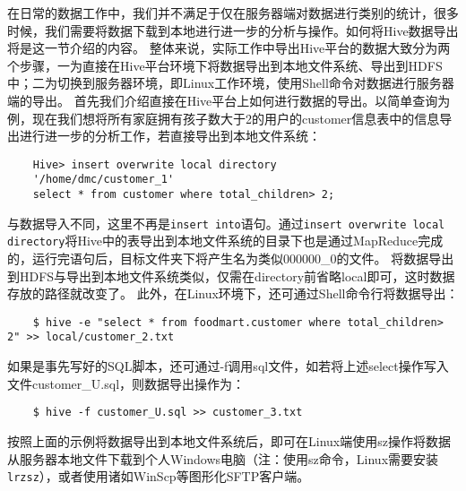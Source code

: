 在日常的数据工作中，我们并不满足于仅在服务器端对数据进行类别的统计，很多时候，我们需要将数据下载到本地进行进一步的分析与操作。如何将Hive数据导出将是这一节介绍的内容。
整体来说，实际工作中导出Hive平台的数据大致分为两个步骤，一为直接在Hive平台环境下将数据导出到本地文件系统、导出到HDFS中；二为切换到服务器环境，即Linux工作环境，使用Shell命令对数据进行服务器端的导出。
首先我们介绍直接在Hive平台上如何进行数据的导出。以简单查询为例，现在我们想将所有家庭拥有孩子数大于2的用户的customer信息表中的信息导出进行进一步的分析工作，若直接导出到本地文件系统：

\begin{lstlisting}
	Hive> insert overwrite local directory
	'/home/dmc/customer_1'
	select * from customer where total_children> 2;
\end{lstlisting}

与数据导入不同，这里不再是\texttt{insert into}语句。通过\texttt{insert overwrite local
directory}将Hive中的表导出到本地文件系统的目录下也是通过MapReduce完成的，运行完语句后，目标文件夹下将产生名为类似000000\_0的文件。
将数据导出到HDFS与导出到本地文件系统类似，仅需在directory前省略local即可，这时数据存放的路径就改变了。
此外，在Linux环境下，还可通过Shell命令行将数据导出：

\begin{lstlisting}
	$ hive -e "select * from foodmart.customer where total_children> 2" >> local/customer_2.txt
\end{lstlisting}

如果是事先写好的SQL脚本，还可通过-f调用sql文件，如若将上述select操作写入文件customer\_U.sql，则数据导出操作为：

\begin{lstlisting}
	$ hive -f customer_U.sql >> customer_3.txt
\end{lstlisting}

按照上面的示例将数据导出到本地文件系统后，即可在Linux端使用sz操作将数据从服务器本地文件下载到个人Windows电脑（注：使用sz命令，Linux需要安装\texttt{lrzsz}），或者使用诸如WinScp等图形化SFTP客户端。
